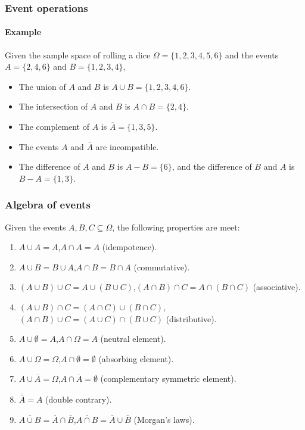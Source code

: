\begin{frame}
\frametitle{Event operations}
\framesubtitle{Example}
Given the sample space of rolling a dice $\Omega=\{1,2,3,4,5,6\}$ and the events $A=\{2,4,6\}$ and $B=\{1,2,3,4\}$, 
\begin{itemize}
\item The union of $A$ and $B$ is $A\cup B=\{1,2,3,4,6\}$.
\item The intersection of $A$ and $B$ is $A\cap B=\{2,4\}$.
\item The complement of $A$ is $\overline A=\{1,3,5\}$.
\item The events $A$ and $\overline A$ are incompatible.
\item The difference of $A$ and $B$ is $A-B=\{6\}$, and the difference of $B$ and $A$ is $B-A=\{1,3\}$.
\end{itemize}
\end{frame}


\begin{frame}
\frametitle{Algebra of events}
Given the events $A,B,C\subseteq \Omega$, the following properties are meet: 
\begin{enumerate}[<+->]
\item $A\cup A=A$,\quad $A\cap A=A$ (idempotence).
\item $A\cup B=B\cup A$,\quad $A\cap B = B\cap A$ (commutative).
\item $(A\cup B)\cup C = A\cup (B\cup C)$,\quad $(A\cap B)\cap C = A\cap (B\cap C)$ (associative).
\item $(A\cup B)\cap C = (A\cap C)\cup (B\cap C)$,\quad $(A\cap B)\cup C = (A\cup C)\cap (B\cup C)$ (distributive).
\item $A\cup \emptyset=A$,\quad $A\cap \Omega=A$ (neutral element).
\item $A\cup \Omega=\Omega$,\quad $A\cap \emptyset=\emptyset$ (absorbing element).
\item $A\cup \overline A = \Omega$,\quad $A\cap \overline A= \emptyset$ (complementary symmetric element).
\item $\overline{\overline A} = A$ (double contrary).
\item $\overline{A\cup B} = \overline A\cap \overline B$,\quad $\overline{A\cap B} = \overline A\cup \overline B$ (Morgan's
laws).
\end{enumerate}
\end{frame}


